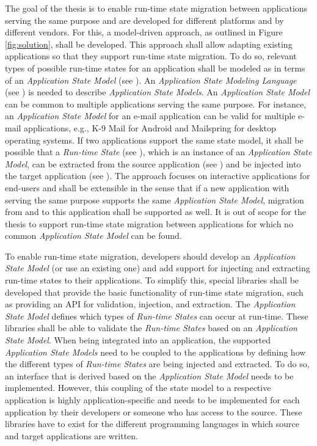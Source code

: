 The goal of the thesis is to enable run-time state migration between applications serving the same purpose and are developed for different platforms and by different vendors. 
For this, a model-driven approach, as outlined in Figure \ref{fig:solution}, shall be developed. 
This approach shall allow adapting existing applications so that they support run-time state migration.
To do so, relevant types of possible run-time states for an application shall be modeled as in terms of an \textit{Application State Model} (see \fcircone).
An \textit{Application State Modeling Language} (see \fcirctwo) is needed to describe \textit{Application State Models}.
An \textit{Application State Model} can be common to multiple applications serving the same purpose. 
For instance, an \textit{Application State Model} for an e-mail application can be valid for multiple e-mail applications, e.g., K-9 Mail for Android and Mailspring for desktop operating systems. 
If two applications support the same state model, it shall be possible that a \textit{Run-time State} (see \fcircthree), which is an instance of an \textit{Application State Model}, can be extracted from the source application (see \fcircfour) and be injected into the target application (see \fcircfive). 
The approach focuses on interactive applications for end-users and shall be extensible in the sense that if a new application with serving the same purpose supports the same \textit{Application State Model}, migration from and to this application shall be supported as well. It is out of scope for the thesis to support run-time state migration between applications for which no common \textit{Application State Model} can be found. 

To enable run-time state migration, developers should develop an \textit{Application State Model} (or use an existing one) and add support for injecting and extracting run-time states to their applications. 
To simplify this, special libraries shall be developed that provide the basic functionality of run-time state migration, such as providing an API for validation, injection, and extraction.
The \textit{Application State Model} defines which types of \textit{Run-time States} can occur at run-time.
These libraries shall be able to validate the \textit{Run-time States} based on an \textit{Application State Model}.
When being integrated into an application, the supported \textit{Application State Models} need to be coupled to the applications by defining how the different types of \textit{Run-time States} are being injected and extracted.
To do so, an interface that is derived based on the \textit{Application State Model} needs to be implemented.
However, this coupling of the state model to a respective application is highly application-specific and needs to be implemented for each application by their developers or someone who has access to the source.
These libraries have to exist for the different programming languages in which source and target applications are written. 

